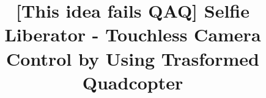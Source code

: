 \documentclass{sig-alternate-ipsn13}
\begin{document}
\title{[This idea fails QAQ] Selfie Liberator - Touchless Camera Control by Using Trasformed Quadcopter}
%
%
%
%
%
\end{document}
